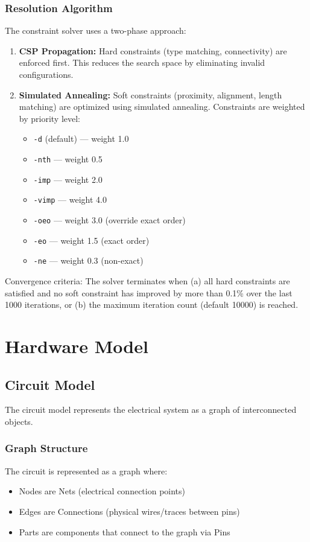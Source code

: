 \section{Resolution Algorithm}
The constraint solver uses a two-phase approach:

\begin{enumerate}
\item \textbf{CSP Propagation:} Hard constraints (type matching, connectivity) are enforced first. This reduces the search space by eliminating invalid configurations.
\item \textbf{Simulated Annealing:} Soft constraints (proximity, alignment, length matching) are optimized using simulated annealing. Constraints are weighted by priority level:
\begin{itemize}
\item \texttt{-d} (default) — weight 1.0
\item \texttt{-nth} — weight 0.5
\item \texttt{-imp} — weight 2.0
\item \texttt{-vimp} — weight 4.0
\item \texttt{-oeo} — weight 3.0 (override exact order)
\item \texttt{-eo} — weight 1.5 (exact order)
\item \texttt{-ne} — weight 0.3 (non-exact)
\end{itemize}
\end{enumerate}

Convergence criteria: The solver terminates when (a) all hard constraints are satisfied and no soft constraint has improved by more than 0.1\% over the last 1000 iterations, or (b) the maximum iteration count (default 10000) is reached.




\part{Hardware Model}
\chapter{Circuit Model}
The circuit model represents the electrical system as a graph of interconnected objects.

\section{Graph Structure}
The circuit is represented as a graph where:
\begin{itemize}
\item Nodes are Nets (electrical connection points)
\item Edges are Connections (physical wires/traces between pins)
\item Parts are components that connect to the graph via Pins
\end{itemize}

